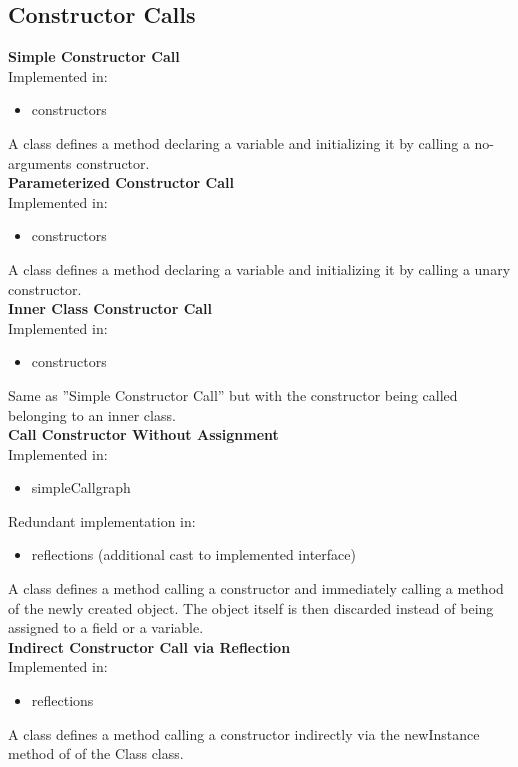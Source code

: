 \documentclass{article}
\begin{document}
\subsection{Constructor Calls}

\textbf{Simple Constructor Call}\\
Implemented in: 
\begin{itemize}
    \item constructors
\end{itemize}
A class defines a method declaring a variable and initializing it by calling a no-arguments constructor.\\

\noindent
\textbf{Parameterized Constructor Call}\\
Implemented in: 
\begin{itemize}
    \item constructors
\end{itemize}
A class defines a method declaring a variable and initializing it by calling a unary constructor.\\

\noindent
\textbf{Inner Class Constructor Call}\\
Implemented in: 
\begin{itemize}
    \item constructors
\end{itemize}
Same as ''Simple Constructor Call'' but with the constructor being called belonging to an inner class.\\

\noindent
\textbf{Call Constructor Without Assignment}\\
Implemented in: 
\begin{itemize}
    \item simpleCallgraph
\end{itemize}
Redundant implementation in: 
\begin{itemize}
    \item reflections (additional cast to implemented interface)
\end{itemize}
A class defines a method calling a constructor and immediately calling a method of the newly created object. The object itself is then discarded instead of being assigned to a field or a variable.\\

\noindent
\textbf{Indirect Constructor Call via Reflection}\\
Implemented in: 
\begin{itemize}
    \item reflections
\end{itemize}
A class defines a method calling a constructor indirectly via the newInstance method of of the Class class.\\
\end{document}
